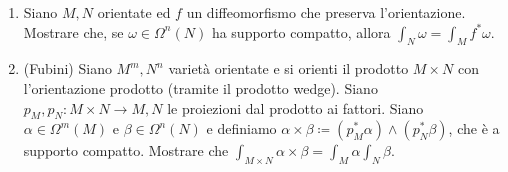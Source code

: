 \begin{exercise}
	\begin{enumerate}
		\item Siano $M,N$ orientate ed $f$ un diffeomorfismo che preserva l'orientazione. Mostrare che, se $\omega\in\Omega^n(N)$ ha supporto compatto, allora $\int_N \omega = \int_M f^*\omega$.
		
		\item (Fubini) Siano $M^m,N^n$ varietà orientate e si orienti il prodotto $M\times N$ con l'orientazione prodotto (tramite il prodotto wedge). Siano $p_M,p_N : M\times N \to M,N$ le proiezioni dal prodotto ai fattori.
		Siano $\alpha \in \Omega^m(M)$ e $\beta \in \Omega^n(N)$ e definiamo
		$\alpha \times \beta \coloneqq (p_M^*\alpha) \wedge (p_N^*\beta)$, che è a supporto compatto.
		Mostrare che $\int_{M\times N} \alpha \times \beta = \int_M\alpha \int_N \beta$.
	\end{enumerate}
\end{exercise}















































































